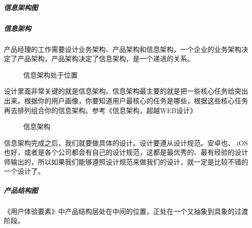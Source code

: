 \documentclass[letterpaper,11pt,english]{sphinxmanual}
\begin{document}
\subparagraph{信息架构图}
\label{\detokenize{chapter_knowledge/flow_chart:information-infra}}\label{\detokenize{chapter_knowledge/flow_chart:id27}}

\subparagraph{信息架构}
\label{\detokenize{chapter_knowledge/flow_chart:id28}}
产品经理的工作需要设计业务架构、产品架构和信息架构。一个企业的业务架构决定了产品架构，产品架构决定了信息架构，是一个递进的关系。%
\begin{footnote}[516]\sphinxAtStartFootnote
{}
%
\end{footnote}

\begin{figure}[H]
\centering
\capstart

\noindent{}
\caption{信息架构处于位置}\label{\detokenize{chapter_knowledge/flow_chart:id43}}\end{figure}

设计里面非常关键的就是信息架构。信息架构最主要的就是把一些核心任务给突出出来。根据你的用户画像，你要知道用户最核心的任务是哪些，根据这些核心任务再去排列组合你的信息架构。参考《信息架构，超越WEB设计》%
\begin{footnote}[517]\sphinxAtStartFootnote
{}
%
\end{footnote}

\begin{figure}[H]
\centering
\capstart

\noindent{}
\caption{信息架构}\label{\detokenize{chapter_knowledge/flow_chart:id44}}\end{figure}

信息架构完成之后，我们就要做具体的设计。设计要遵从设计规范。安卓也、
iOS也好，或者是各个公司都会有自己的设计规范，这都是最优秀的、最有经验的设计师输出的，所以如果我们能够遵照设计规范来做我们的设计，就一定是比较不错的一个设计了。
%
\begin{footnote}[518]\sphinxAtStartFootnote
{}
%
\end{footnote}


\subparagraph{产品结构图}
\label{\detokenize{chapter_knowledge/flow_chart:id29}}
《用户体验要素》中产品结构层处在中间的位置，正处在一个又抽象到具象的过渡阶段。%
\begin{footnote}[519]\sphinxAtStartFootnote
{}
%
\end{footnote}
\end{document}
